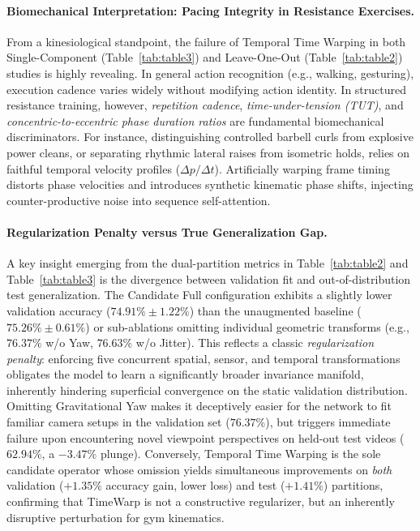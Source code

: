 \documentclass[runningheads]{llncs}
\begin{document}
\paragraph{Biomechanical Interpretation: Pacing Integrity in Resistance Exercises.}
From a kinesiological standpoint, the failure of Temporal Time Warping in both Single-Component (Table~\ref{tab:table3}) and Leave-One-Out (Table~\ref{tab:table2}) studies is highly revealing. In general action recognition (e.g., walking, gesturing), execution cadence varies widely without modifying action identity. In structured resistance training, however, \textit{repetition cadence}, \textit{time-under-tension (TUT)}, and \textit{concentric-to-eccentric phase duration ratios} are fundamental biomechanical discriminators. For instance, distinguishing controlled barbell curls from explosive power cleans, or separating rhythmic lateral raises from isometric holds, relies on faithful temporal velocity profiles ($\Delta p / \Delta t$). Artificially warping frame timing distorts phase velocities and introduces synthetic kinematic phase shifts, injecting counter-productive noise into sequence self-attention.

\paragraph{Regularization Penalty versus True Generalization Gap.}
A key insight emerging from the dual-partition metrics in Table~\ref{tab:table2} and Table~\ref{tab:table3} is the divergence between validation fit and out-of-distribution test generalization. The Candidate Full configuration exhibits a slightly lower validation accuracy ($74.91\% \pm 1.22\%$) than the unaugmented baseline ($75.26\% \pm 0.61\%$) or sub-ablations omitting individual geometric transforms (e.g., $76.37\%$ w/o Yaw, $76.63\%$ w/o Jitter). This reflects a classic \textit{regularization penalty}: enforcing five concurrent spatial, sensor, and temporal transformations obligates the model to learn a significantly broader invariance manifold, inherently hindering superficial convergence on the static validation distribution. Omitting Gravitational Yaw makes it deceptively easier for the network to fit familiar camera setups in the validation set ($76.37\%$), but triggers immediate failure upon encountering novel viewpoint perspectives on held-out test videos ($62.94\%$, a $-3.47\%$ plunge). Conversely, Temporal Time Warping is the sole candidate operator whose omission yields simultaneous improvements on \textit{both} validation ($+1.35\%$ accuracy gain, lower loss) and test ($+1.41\%$) partitions, confirming that TimeWarp is not a constructive regularizer, but an inherently disruptive perturbation for gym kinematics.
\end{document}
